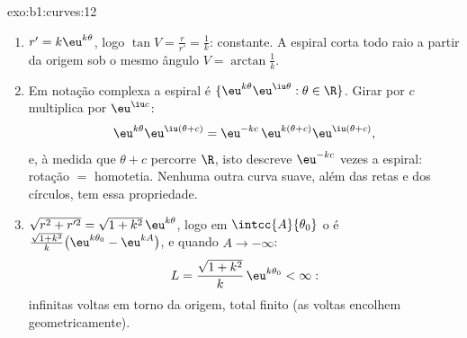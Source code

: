 \begin{solution}{exo:b1:curves:12}
\begin{enumerate}
  \item $r' = k\eu^{k\theta}$, logo $\tan V = \frac{r}{r'} =
        \frac1k$: constante. A espiral corta todo raio a
        partir da origem sob o mesmo ângulo $V = \arctan\frac1k$.
  \item Em notação complexa a espiral é $\{\eu^{k\theta}
        \eu^{\iu\theta} : \theta \in \R\}$. Girar por $c$
        multiplica por $\eu^{\iu c}$:
        \[
        \eu^{k\theta}\eu^{\iu(\theta + c)}
        = \eu^{-kc}\,\eu^{k(\theta + c)}\eu^{\iu(\theta+c)} ,
        \]
        e, à medida que $\theta + c$ percorre $\R$, isto descreve $\eu^{-kc}$
        vezes a espiral: rotação $=$ homotetia. Nenhuma outra curva
        suave, além das retas e dos círculos, tem essa propriedade.
  \item $\sqrt{r^2 + r'^2} = \sqrt{1 + k^2}\,\eu^{k\theta}$, logo em $\intcc{A}{\theta_0}$ o  é $\frac{\sqrt{1+k^2}}{k}\bigl(\eu^{k\theta_0} -
        \eu^{kA}\bigr)$, e quando $A \to -\infty$:
        \[
        L = \frac{\sqrt{1 + k^2}}{k}\,\eu^{k\theta_0} < \infty :
        \]
        infinitas voltas em torno da origem,  total finito
        (as voltas encolhem geometricamente).
\end{enumerate}
\end{solution}

